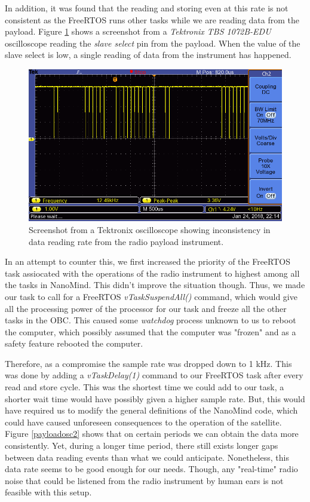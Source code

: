 \documentclass[english,12pt,a4paper,pdftex,elec,utf8]{aaltothesis}
\begin{document}
In addition, it was found that the reading and storing even at this rate is not consistent as the FreeRTOS runs other tasks while we are reading data from the payload. Figure \ref{payloadosc1} shows a screenshot from a \textit{Tektronix TBS 1072B-EDU} oscilloscope reading the \textit{slave select} pin from the payload. When the value of the slave select is low, a single reading of data from the instrument has happened.
\begin{figure}[h!]
\centering
\includegraphics[scale=0.5]{F0001TEK}
\caption{Screenshot from a Tektronix oscilloscope showing inconsistency in data reading rate from the radio payload instrument.}
\label{payloadosc1}
\end{figure}
In an attempt to counter this, we first increased the priority of the FreeRTOS task assiocated with the operations of the radio instrument to highest among all the tasks in NanoMind. This didn't improve the situation though. Thus, we made our task to call for a FreeRTOS \textit{vTaskSuspendAll()} command, which would give all the processing power of the processor for our task and freeze all the other tasks in the OBC. This caused some \textit{watchdog} process unknown to us to reboot the computer, which possibly assumed that the computer was "frozen" and as a safety feature rebooted the computer.\par
Therefore, as a compromise the sample rate was dropped down to 1 kHz. This was done by adding a \textit{vTaskDelay(1)} command to our FreeRTOS task after every read and store cycle. This was the shortest time we could add to our task, a shorter wait time would have possibly given a higher sample rate. But, this would have required us to modify the general definitions of the NanoMind code, which could have caused unforeseen consequences to the operation of the satellite. Figure \ref{payloadosc2} shows that on certain periods we can obtain the data more consistently. Yet, during a longer time period, there still exists longer gaps between data reading events than what we could anticipate. Nonetheless, this data rate seems to be good enough for our needs. Though, any "real-time" radio noise that could be listened from the radio instrument by human ears is not feasible with this setup.\par
\end{document}
